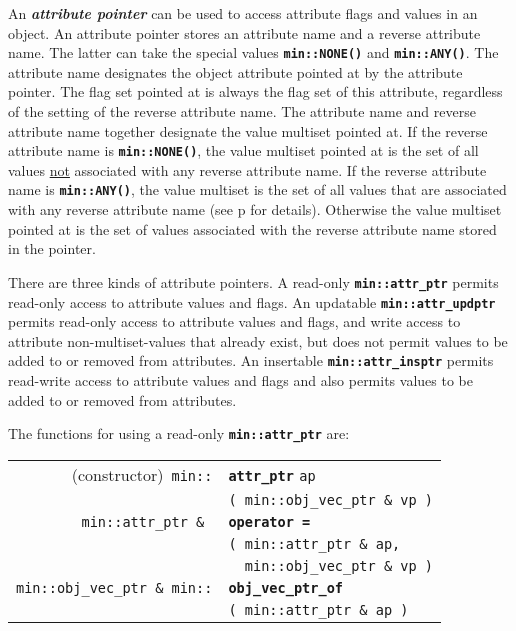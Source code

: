 \documentclass[12pt]{article}
\makeatletter
\newcommand{\TT}[1]{{\tt \bfseries #1}}
\newcommand{\key}[1]{{\bf \em #1}\index{#1}}
\newcommand{\ttindex}[1]{\index{#1@{\tt #1}}}
\newcommand{\ttmindex}[2]{\index{#1@{\tt #1}!#2}}
\newcommand{\ttomkey}[3]{\TT{operator #2}\index{#1@{\tt operator #2}!{#3}}}
\newcommand{\pagref}[1]{p\pageref{#1}}
\newcommand{\EOL}{\penalty \exhyphenpenalty}
\newenvironment{indpar}[1][0.3in]%
	{\begin{list}{}%
		     {\setlength{\itemsep}{0in}%
		      \setlength{\topsep}{0in}%
		      \setlength{\parsep}{1ex}%
		      \setlength{\labelwidth}{#1}%
		      \setlength{\leftmargin}{#1}%
		      \addtolength{\leftmargin}{\labelsep}}%
	 \item}%
	{\end{list}}
\newcommand{\LABEL}[1]{\label{#1}}
\newlength{\ARGBREAKLENGTH}
\newcommand{\ARGBREAK}[1][\ARGBREAKLENGTH]{\\&\hspace*{#1}}
\newcommand{\TTOMKEY}[3]{\ttomkey{#1}{#2}{#3}}
\newcommand{\MINKEY}[1]%
	   {\TT{#1}\ttindex{min::#1}\ttindex{#1}}
\newcommand{\MINMKEY}[2]%
           {\TT{#1}\ttmindex{min::#1}{#2}\ttmindex{#1}{#2}}
\makeatother
\begin{document}
An \key{attribute pointer} can be used to access attribute
flags and values
in an object.
An attribute pointer stores an attribute name
and a reverse attribute name.  The latter can take the special
values \TT{min::NONE()} and \TT{min::ANY()}.  The attribute name designates
the object attribute pointed at by the attribute pointer.
The flag set pointed at is always
the flag set of this attribute, regardless of the setting of the
reverse attribute name.  The attribute name and
reverse attribute name together designate the
value multiset pointed at.  If the reverse attribute name
is \TT{min::NONE()}, the value multiset pointed at is the set of all values
\underline{not} associated with any reverse attribute name.  If the
reverse attribute name is \TT{min::ANY()},
the value multiset is the set of all
values that are associated with any reverse attribute name
(see \pagref{REVERSE-ATTRIBUTE-NAME-ANY} for details).
Otherwise the value multiset pointed at is the set of values
associated with the reverse attribute name stored in the pointer.

There are three kinds of attribute pointers.
A read-only \TT{min::\EOL attr\_\EOL ptr}
permits read-only access to attribute values and flags.
An updatable \TT{min::\EOL attr\_\EOL updptr}
permits read-only access to attribute values and flags,
and write access to attribute non-multiset-values that already exist,
but does not permit values to be added to or removed from attributes.
An insertable \TT{min::\EOL attr\_\EOL insptr}
permits read-write access to attribute values and flags
and also permits values to be added to or removed from attributes.

The functions for using a read-only \TT{min::\EOL attr\_\EOL ptr}
are:

\begin{indpar}\begin{tabular}{r@{}l}
(constructor)~\verb|min::|
	& \MINKEY{attr\_ptr} \verb|ap|\ARGBREAK
	  \verb|( min::obj_vec_ptr & vp )|
\LABEL{MIN::ATTR_PTR_OF_OBJ_VEC_PTR} \\
\verb|min::attr_ptr & |
	& \TTOMKEY{=}{=}{of {\tt min::attr\_ptr}}\ARGBREAK
	  \verb|( min::attr_ptr & ap,|\ARGBREAK
	  \verb|  min::obj_vec_ptr & vp )|
\LABEL{MIN::=ATTR_PTR_OF_OBJ_VEC_PTR} \\
\verb|min::obj_vec_ptr & min::|
	& \MINMKEY{obj\_vec\_ptr\_of}{of {\tt attr\_ptr}}\ARGBREAK
	  \verb|( min::attr_ptr & ap )|
\LABEL{MIN::OBJ_VEC_PTR_OF_ATTR_PTR} \\
\end{tabular}\end{indpar}
\end{document}
